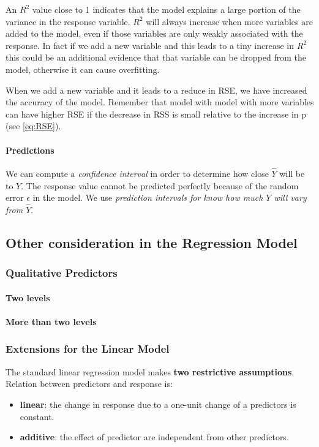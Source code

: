 \documentclass[a4paper]{article}
\begin{document}
							An $R^2$ value close to 1 indicates that the model explains a large portion of the variance in the response variable. $R^2$ will always increase when more variables are added to the model, even if those variables are only weakly associated with the response. In fact if we add a new variable and this leads to a tiny increase in $R^2$ this could be an additional evidence that that variable can be dropped from the model, otherwise it can cause overfitting.
							
							When we add a new variable and it leads to a reduce in RSE, we have increased the accuracy of the model. Remember that model with model with more variables can have higher RSE if the decrease in RSS is small relative to the increase in p (see \ref{eq:RSE}).
							
						\paragraph{Predictions}
							We can compute a \textit{confidence interval} in order to determine how close $\hat{Y}$ will be to $Y$. The response value cannot be predicted perfectly because of the random error $\epsilon$ in the model. We use \textit{prediction intervals for know how much $Y$ will vary from $\hat{Y}$}.
							
							
					\subsection{Other consideration in the Regression Model}
					
						\subsubsection{Qualitative Predictors}
							
							\paragraph{Two levels}
							
							\paragraph{More than two levels}
							
						\subsubsection{Extensions for the Linear Model}
							The standard linear regression model makes \textbf{two restrictive assumptions}. Relation between predictors and response is:
							\begin{itemize}
								\item \textbf{linear}: the change in response due to a one-unit change of a predictors is constant.
								\item \textbf{additive}: the effect of predictor are independent from other predictors.
							\end{itemize}
							
\end{document}

